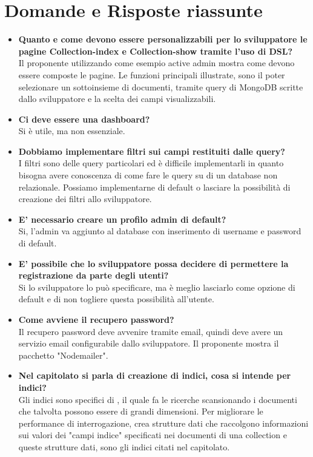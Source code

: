 \section{Domande e Risposte riassunte}
	\begin{itemize} 
		\item 
		{\bfseries Quanto e come devono essere personalizzabili per lo sviluppatore le pagine Collection-index
		e Collection-show tramite l'uso di DSL?} \\
		Il proponente utilizzando come esempio active admin mostra come devono essere composte le pagine.
		Le funzioni principali illustrate, sono il poter selezionare un sottoinsieme di documenti, tramite query di MongoDB scritte
		dallo sviluppatore e la scelta dei campi visualizzabili.	
		
		\item 
		{\bfseries Ci deve essere una dashboard?} \\
		Si è utile, ma non essenziale. 
		
		\item
		{\bfseries Dobbiamo implementare filtri sui campi restituiti dalle query?} \\
		I filtri sono delle query particolari ed è difficile implementarli in quanto bisogna avere conoscenza di come fare le query su di un database non relazionale.
		Possiamo implementarne di default o lasciare la possibilità di creazione dei filtri allo sviluppatore.
		
		\item
		{\bfseries E' necessario creare un profilo admin di default?} \\
		Si, l'admin va aggiunto al database con inserimento di username e password di default.
		
		\item
		{\bfseries E' possibile che lo sviluppatore possa decidere di permettere la registrazione da parte degli utenti?} \\
		 Si lo sviluppatore lo può specificare, ma è meglio lasciarlo come opzione di default e di non togliere questa possibilità
		 all'utente.
		
		\item
		{\bfseries Come avviene il recupero password?} \\
		Il recupero password deve avvenire tramite email, quindi \ProjectName  deve avere un servizio email configurabile dallo sviluppatore.
		Il proponente mostra il pacchetto "Nodemailer".
		
		\item
		{\bfseries Nel capitolato si parla di creazione di indici, cosa si intende per indici?} \\
		Gli indici sono specifici di , il quale fa le ricerche scansionando i documenti che talvolta possono essere di grandi dimensioni. Per migliorare le performance di interrogazione,  crea strutture dati che raccolgono informazioni sui valori dei "campi indice" specificati nei documenti di una collection e queste strutture dati, sono gli indici citati nel capitolato.
		

\end{itemize}
